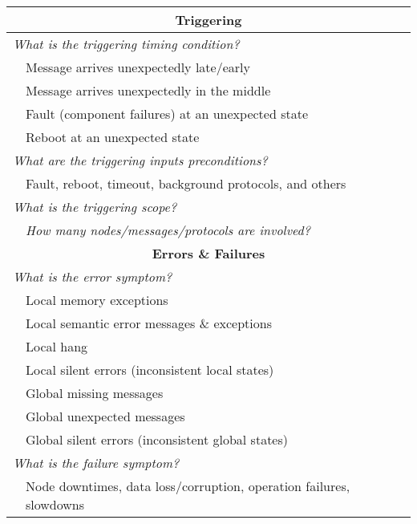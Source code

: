 \begin{table}[!htb]
\centering
\begin{tabular}{lp{5.5in}}
\toprule
\multicolumn{2}{c}{{\bf Triggering} }\\
\midrule
\multicolumn{2}{l}{\it What is the triggering timing condition?}\\
&{Message arrives unexpectedly late/early}\\
&{Message arrives unexpectedly in the middle}\\
&{Fault (component failures) at an unexpected state}\\
&{Reboot at an unexpected state}\\
\multicolumn{2}{l}{\it What are the triggering inputs preconditions?}\\
 & {Fault, reboot, timeout, background protocols, and others}\\ 
\multicolumn{2}{l}{\it What is the triggering scope?}\\
&{\it How many nodes/messages/protocols are involved?}\\
\midrule
\multicolumn{2}{c}{{\bf Errors \& Failures} }\\
\midrule
\multicolumn{2}{l}{\it What is the error symptom?}\\
&{Local memory exceptions}\\
&{Local semantic error messages \& exceptions}\\
&{Local hang}\\
&{Local silent errors (inconsistent local states) }\\
&{Global missing messages}\\
&{Global unexpected messages}\\
&{Global silent errors (inconsistent global states)}\\
\multicolumn{2}{l}{\it What is the failure symptom?}\\
&{Node downtimes, data loss/corruption, operation failures, slowdowns}\\
\midrule

\end{tabular}
\end{table}

